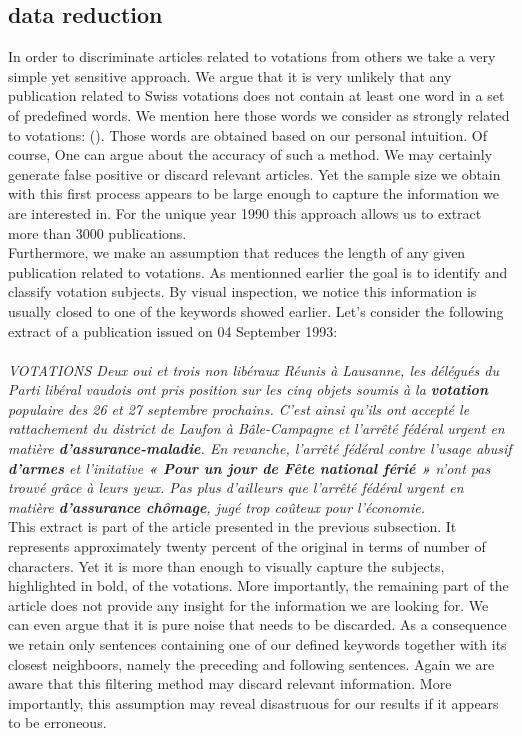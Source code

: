 \documentclass[11pt]{article}
\begin{document}
\subsection{data reduction}

In order to discriminate articles related to votations from others we take a very simple yet sensitive approach. We argue that it is very unlikely that any publication related to Swiss votations does not contain at least one word in a set of predefined words. We mention here those words we consider as strongly related to votations: (). Those words are obtained based on our personal intuition. Of course, One can argue about the accuracy of such a method. We may certainly generate false positive or discard relevant articles. Yet the sample size we obtain with this first process appears to be large enough to capture the information we are interested in. For the unique year 1990 this approach allows us to extract more than 3000 publications.
\\
Furthermore, we make an assumption that reduces the length of any given publication related to votations. As mentionned earlier the goal is to identify and classify votation subjects. By visual inspection, we notice this information is usually closed to one of the keywords showed earlier. 
Let's consider the following extract of a publication issued on 04 September 1993:\\
\\
\textit{VOTATIONS Deux oui et trois non libéraux Réunis à Lausanne, les délégués du Parti libéral vaudois ont pris position sur les cinq objets soumis à la \textbf{votation} populaire des 26 et 27 septembre prochains. C'est ainsi qu'ils ont accepté le rattachement du district de Laufon à Bâle-Campagne et l'arrêté fédéral urgent en matière \textbf{d'assurance-maladie}. En revanche, l'arrêté fédéral contre l'usage abusif \textbf{d'armes} et l'initative \textbf{« Pour un jour de Fête national férié »} n'ont pas trouvé grâce à leurs yeux. Pas plus d'ailleurs que l'arrêté fédéral urgent en matière \textbf{d'assurance chômage}, jugé trop coûteux pour l'économie.}\\

This extract is part of the article presented in the previous subsection. It represents approximately twenty percent of the original in terms of number of characters. Yet it is more than enough to visually capture the subjects, highlighted in bold, of the votations. More importantly, the remaining part of the article does not provide any insight for the information we are looking for. We can even argue that it is pure noise that needs to be discarded. As a consequence we retain only sentences containing one of our defined keywords together with its closest neighboors, namely the preceding and following sentences. Again we are aware that this filtering method may discard relevant information. More importantly, this assumption may reveal disastruous for our results if it appears to be erroneous.
\end{document}
